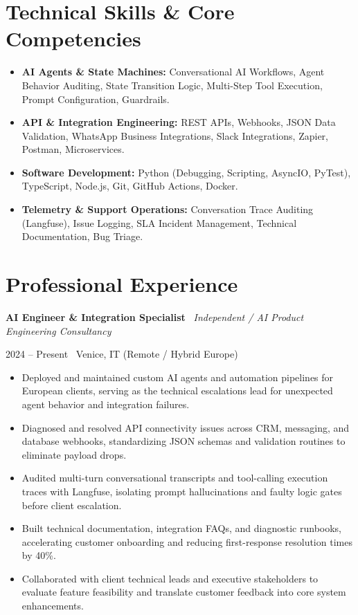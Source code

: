 \documentclass[a4paper,10pt]{article}
\newcommand{\role}[4]{%
  \vspace{2pt}\noindent
  \begin{minipage}[t]{0.70\textwidth}\raggedright\textbf{#1} \textbullet\ \textit{#3}\end{minipage}%
  \hfill
  \begin{minipage}[t]{0.28\textwidth}\raggedleft\footnotesize\color{gray}#2 \textbullet\ #4\end{minipage}%
  \vspace{1pt}%
}
\begin{document}
\section{Technical Skills \& Core Competencies}
\begin{itemize}[leftmargin=1.2em, itemsep=2pt]
  \item \textbf{AI Agents \& State Machines:} Conversational AI Workflows, Agent Behavior Auditing, State Transition Logic, Multi-Step Tool Execution, Prompt Configuration, Guardrails.
  \item \textbf{API \& Integration Engineering:} REST APIs, Webhooks, JSON Data Validation, WhatsApp Business Integrations, Slack Integrations, Zapier, Postman, Microservices.
  \item \textbf{Software Development:} Python (Debugging, Scripting, AsyncIO, PyTest), TypeScript, Node.js, Git, GitHub Actions, Docker.
  \item \textbf{Telemetry \& Support Operations:} Conversation Trace Auditing (Langfuse), Issue Logging, SLA Incident Management, Technical Documentation, Bug Triage.
\end{itemize}

\section{Professional Experience}

\role{AI Engineer \& Integration Specialist}{2024 -- Present}{Independent / AI Product Engineering Consultancy}{Venice, IT (Remote / Hybrid Europe)}
\begin{itemize}
  \item Deployed and maintained custom AI agents and automation pipelines for European clients, serving as the technical escalations lead for unexpected agent behavior and integration failures.
  \item Diagnosed and resolved API connectivity issues across CRM, messaging, and database webhooks, standardizing JSON schemas and validation routines to eliminate payload drops.
  \item Audited multi-turn conversational transcripts and tool-calling execution traces with Langfuse, isolating prompt hallucinations and faulty logic gates before client escalation.
  \item Built technical documentation, integration FAQs, and diagnostic runbooks, accelerating customer onboarding and reducing first-response resolution times by 40\%.
  \item Collaborated with client technical leads and executive stakeholders to evaluate feature feasibility and translate customer feedback into core system enhancements.
\end{itemize}
\end{document}
